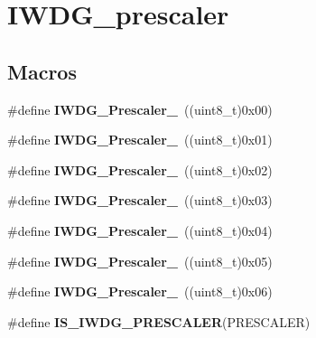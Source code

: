 \hypertarget{group___i_w_d_g__prescaler}{\section{I\-W\-D\-G\-\_\-prescaler}
\label{group___i_w_d_g__prescaler}
}
\subsection*{Macros}
\begin{DoxyCompactItemize}
\item 
\hypertarget{group___i_w_d_g__prescaler_ga82a058c196d5a9cd7ea2f2202b394ba0}{\#define {\bfseries I\-W\-D\-G\-\_\-\-Prescaler\-\_}~((uint8\-\_\-t)0x00)}\label{group___i_w_d_g__prescaler_ga82a058c196d5a9cd7ea2f2202b394ba0}

\item 
\hypertarget{group___i_w_d_g__prescaler_ga59763b9a127c67adf5d11474188996a1}{\#define {\bfseries I\-W\-D\-G\-\_\-\-Prescaler\-\_}~((uint8\-\_\-t)0x01)}\label{group___i_w_d_g__prescaler_ga59763b9a127c67adf5d11474188996a1}

\item 
\hypertarget{group___i_w_d_g__prescaler_gafa81d30511ff5ec74bb38ed71f5bb66e}{\#define {\bfseries I\-W\-D\-G\-\_\-\-Prescaler\-\_}~((uint8\-\_\-t)0x02)}\label{group___i_w_d_g__prescaler_gafa81d30511ff5ec74bb38ed71f5bb66e}

\item 
\hypertarget{group___i_w_d_g__prescaler_gaa8b091b6e4102513b1e3a1c4eb6756ba}{\#define {\bfseries I\-W\-D\-G\-\_\-\-Prescaler\-\_}~((uint8\-\_\-t)0x03)}\label{group___i_w_d_g__prescaler_gaa8b091b6e4102513b1e3a1c4eb6756ba}

\item 
\hypertarget{group___i_w_d_g__prescaler_ga7ea813c73ae0acb40acb60e7d3956910}{\#define {\bfseries I\-W\-D\-G\-\_\-\-Prescaler\-\_}~((uint8\-\_\-t)0x04)}\label{group___i_w_d_g__prescaler_ga7ea813c73ae0acb40acb60e7d3956910}

\item 
\hypertarget{group___i_w_d_g__prescaler_gaea6bf96c2fd5a6f3b9574e7898096641}{\#define {\bfseries I\-W\-D\-G\-\_\-\-Prescaler\-\_}~((uint8\-\_\-t)0x05)}\label{group___i_w_d_g__prescaler_gaea6bf96c2fd5a6f3b9574e7898096641}

\item 
\hypertarget{group___i_w_d_g__prescaler_ga7d6e918748185639049644c970db2b43}{\#define {\bfseries I\-W\-D\-G\-\_\-\-Prescaler\-\_}~((uint8\-\_\-t)0x06)}\label{group___i_w_d_g__prescaler_ga7d6e918748185639049644c970db2b43}

\item 
\#define {\bfseries I\-S\-\_\-\-I\-W\-D\-G\-\_\-\-P\-R\-E\-S\-C\-A\-L\-E\-R}(P\-R\-E\-S\-C\-A\-L\-E\-R)
\end{DoxyCompactItemize}


